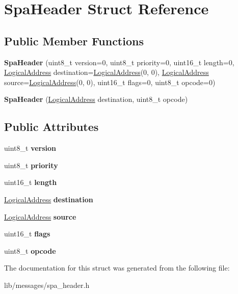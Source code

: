 \hypertarget{structSpaHeader}{}\section{Spa\+Header Struct Reference}
\label{structSpaHeader}
\subsection*{Public Member Functions}
\begin{DoxyCompactItemize}
\item 
\mbox{\label{structSpaHeader_ae285cc7f5785c5d5940ae05a4e93a4f9}} 
{\bfseries Spa\+Header} (uint8\+\_\+t version=0, uint8\+\_\+t priority=0, uint16\+\_\+t length=0, \hyperlink{structLogicalAddress}{Logical\+Address} destination=\hyperlink{structLogicalAddress}{Logical\+Address}(0, 0), \hyperlink{structLogicalAddress}{Logical\+Address} source=\hyperlink{structLogicalAddress}{Logical\+Address}(0, 0), uint16\+\_\+t flags=0, uint8\+\_\+t opcode=0)
\item 
\mbox{\label{structSpaHeader_a478d40ca88735ff0de2ea92fa2be14f8}} 
{\bfseries Spa\+Header} (\hyperlink{structLogicalAddress}{Logical\+Address} destination, uint8\+\_\+t opcode)
\end{DoxyCompactItemize}
\subsection*{Public Attributes}
\begin{DoxyCompactItemize}
\item 
\mbox{\label{structSpaHeader_ad0b9fa178a6b015fdfc312e1bd5fc927}} 
uint8\+\_\+t {\bfseries version}
\item 
\mbox{\label{structSpaHeader_a3d04bb2382ba9e4a61a05b0f97779d7c}} 
uint8\+\_\+t {\bfseries priority}
\item 
\mbox{\label{structSpaHeader_a3e5638afb3bf73d772b912d17b68da04}} 
uint16\+\_\+t {\bfseries length}
\item 
\mbox{\label{structSpaHeader_a0e1de2c2d1f0a5d757ca558801c46ff6}} 
\hyperlink{structLogicalAddress}{Logical\+Address} {\bfseries destination}
\item 
\mbox{\label{structSpaHeader_ad30add6637ff3a67a3043861c7cee511}} 
\hyperlink{structLogicalAddress}{Logical\+Address} {\bfseries source}
\item 
\mbox{\label{structSpaHeader_af39e8bfb4d14dd363f6e86f5a794ae2b}} 
uint16\+\_\+t {\bfseries flags}
\item 
\mbox{\label{structSpaHeader_abadd112ec54980ec8810eaefe4ba9eec}} 
uint8\+\_\+t {\bfseries opcode}
\end{DoxyCompactItemize}


The documentation for this struct was generated from the following file\+:\begin{DoxyCompactItemize}
\item 
lib/messages/spa\+\_\+header.\+h\end{DoxyCompactItemize}
